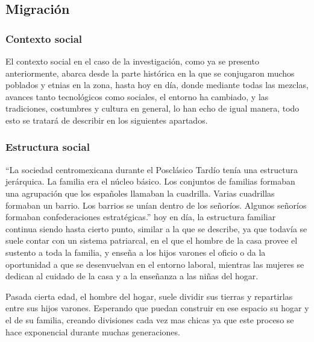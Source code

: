 \subsection{Migración}
\subsubsection{Contexto social}
El contexto social en el caso de la investigación, como ya se presento anteriormente, abarca desde la parte histórica en la que se conjugaron muchos poblados y etnias en la zona, hasta hoy en día, donde mediante todas las mezclas, avances tanto tecnológicos como sociales, el entorno ha cambiado, y las tradiciones, costumbres y cultura en general, lo han echo de igual manera, todo esto se tratará de describir en los siguientes apartados. 

\subsubsection{Estructura social}
``La sociedad centromexicana durante el Posclásico Tardío tenía una estructura jerárquica. La familia era el núcleo básico. Los conjuntos de familias formaban una agrupación que los españoles llamaban la cuadrilla. Varias cuadrillas formaban un barrio. Los barrios se unían dentro de los señoríos. Algunos señoríos formaban confederaciones estratégicas.'' \citep[p. 156]{Otomies} hoy en día, la estructura familiar continua siendo hasta cierto punto, similar a la que se describe, ya que todavía se suele contar con un sistema patriarcal, en el que el hombre de la casa provee el sustento a toda la familia, y enseña a los hijos varones el oficio o da la oportunidad a que se desenvuelvan en el entorno laboral, mientras las mujeres se dedican al cuidado de la casa y a la enseñanza a las niñas del hogar.

Pasada cierta edad, el hombre del hogar, suele dividir sus tierras y repartirlas entre sus hijos varones. Esperando que puedan construir en ese espacio su hogar y el de su familia, creando divisiones cada vez mas chicas ya que este proceso se hace exponencial durante muchas generaciones.

